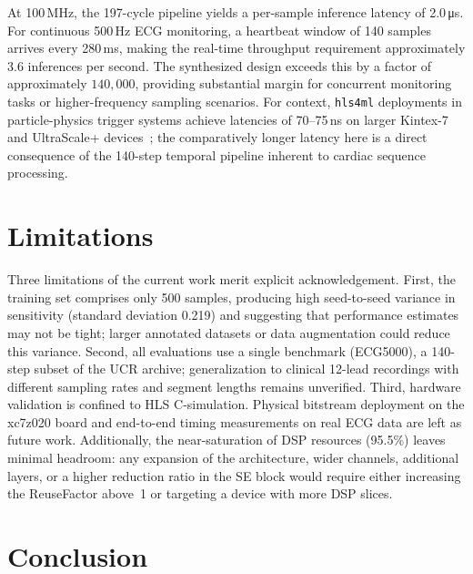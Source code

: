 \documentclass[12pt, letterpaper]{article}
\begin{document}
At 100\,MHz, the 197-cycle pipeline yields a per-sample inference latency
of 2.0\,\si{\micro\second}. For continuous 500\,Hz ECG monitoring, a
heartbeat window of 140 samples arrives every 280\,ms, making the
real-time throughput requirement approximately 3.6 inferences per second.
The synthesized design exceeds this by a factor of approximately
$140{,}000$, providing substantial margin for concurrent monitoring tasks
or higher-frequency sampling scenarios. For context, \texttt{hls4ml}
deployments in particle-physics trigger systems achieve latencies of
70--75\,ns on larger Kintex-7 and UltraScale+ devices~\cite{Duarte2018,Aarrestad2021};
the comparatively longer latency here is a direct consequence of the
140-step temporal pipeline inherent to cardiac sequence processing.

\section{Limitations}
\label{sec:limits}

Three limitations of the current work merit explicit acknowledgement.
First, the training set comprises only 500 samples, producing high
seed-to-seed variance in sensitivity (standard deviation 0.219) and
suggesting that performance estimates may not be tight; larger annotated
datasets or data augmentation could reduce this variance. Second, all
evaluations use a single benchmark (ECG5000), a 140-step subset of the
UCR archive; generalization to clinical 12-lead recordings with different
sampling rates and segment lengths remains unverified. Third, hardware
validation is confined to HLS C-simulation. Physical bitstream
deployment on the xc7z020 board and end-to-end timing measurements on
real ECG data are left as future work. Additionally, the near-saturation
of DSP resources (95.5\%) leaves minimal headroom: any expansion of the
architecture, wider channels, additional layers, or a higher
reduction ratio in the SE block would require either increasing the
ReuseFactor above~1 or targeting a device with more DSP slices.

\section{Conclusion}
\label{sec:conclusion}
\end{document}
